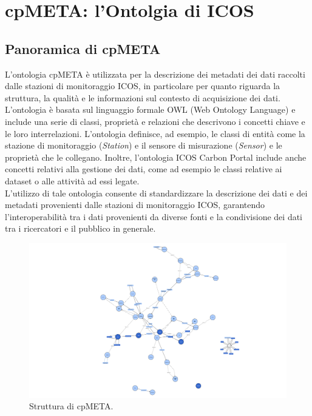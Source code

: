 \chapter{cpMETA: l'Ontolgia di ICOS}
\label{chap:cpMETA}

\section{Panoramica di cpMETA}
\label{section:panoramica}
L'ontologia cpMETA \cite{cpMETAOntology} è utilizzata per
la descrizione dei metadati dei dati raccolti
dalle stazioni di monitoraggio ICOS, in particolare
per quanto riguarda la struttura, la qualità e le
informazioni sul contesto di acquisizione dei dati.\\

L'ontologia è basata sul linguaggio formale OWL
(Web Ontology Language) e include una serie di classi,
proprietà e relazioni che descrivono i concetti chiave
e le loro interrelazioni. L'ontologia definisce,
ad esempio, le classi di entità come
la stazione di monitoraggio (\textit{Station}) e
il sensore di misurazione (\textit{Sensor}) e le
proprietà che le collegano. Inoltre, l'ontologia ICOS
Carbon Portal include
anche concetti relativi alla gestione dei dati,
come ad esempio le classi relative ai dataset o alle attività
ad essi legate.\\

L'utilizzo di tale ontologia
consente di standardizzare la descrizione dei
dati e dei metadati provenienti dalle stazioni di
monitoraggio ICOS, garantendo l'interoperabilità tra
i dati provenienti da diverse fonti e la condivisione
dei dati tra i ricercatori e il pubblico in generale.\\

\begin{figure}[h!]
    \centering
    \includegraphics[height=0.6\textwidth]{figures/instanceschema.rdf-_1_.jpg}
    \caption{Struttura di cpMETA.}
    \label{figure:cpmetastructure}
\end{figure}

